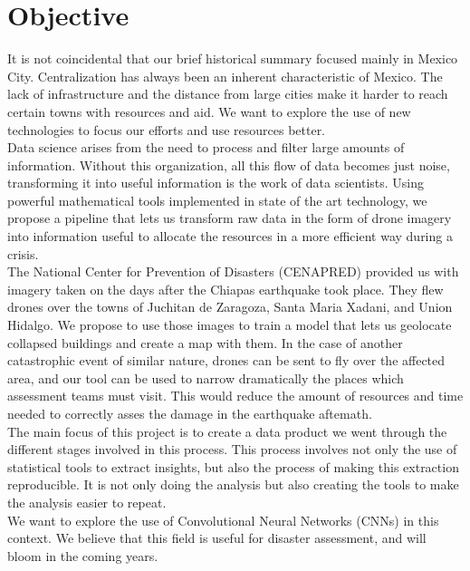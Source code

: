 \section{Objective}

It is not coincidental that our brief historical summary focused mainly in Mexico City. Centralization has always been an inherent characteristic of Mexico. The lack of infrastructure and the distance from large cities make it harder to reach certain towns with resources and aid. We want to explore the use of new technologies to focus our efforts and use resources better.\\

Data science arises from the need to process and filter large amounts of information. Without this organization, all this flow of data becomes just noise, transforming it into useful information is the work of data scientists. Using powerful mathematical tools implemented in state of the art technology, we propose a pipeline that lets us transform raw data in the form of drone imagery into information useful to allocate the resources in a more efficient way during a crisis.\\

The National Center for Prevention of Disasters (CENAPRED) provided us with imagery taken on the days after the Chiapas earthquake took place. They flew drones over the towns of Juchitan de Zaragoza, Santa Maria Xadani, and Union Hidalgo. We propose to use those images to train a model that lets us geolocate collapsed buildings and create a map with them. In the case of another catastrophic event of similar nature, drones can be sent to fly over the affected area, and our tool can be used to narrow dramatically the places which assessment teams must visit. This would reduce the amount of resources and time needed to correctly asses the damage in the earthquake aftemath.\\

The main focus of this project is to create a data product we went through the different stages involved in this process. This process involves not only the use of statistical tools to extract insights, but also the process of making this extraction reproducible. It is not only doing the analysis but also creating the tools to make the analysis easier to repeat.\\

We want to explore the use of Convolutional Neural Networks (CNNs) in this context. We believe that this field is useful for disaster assessment, and will bloom in the coming years.\\

